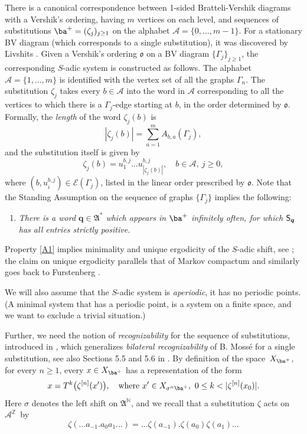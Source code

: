 \documentclass[JEP,XML,SOM,Unicode]{cedram}
\let\mathcal\mathscr
\theoremstyle{plain}
\theoremstyle{definition}
\newcommand\bq{{\boldsymbol q}}
\let\Gam\Gamma
\let\sig\sigma
\newcommand\ok{\mathfrak{o}}
\newcommand\FrA{\mathfrak{A}}
\newcommand\Ak{\mathcal{A}}
\newcommand\A{\mathcal{A}}
\newcommand{\Ek}{\mathcal{E}}
\newcommand{\Z}{\mathbb{Z}}
\newcommand{\N}{\mathbb{N}}
\newcommand\Sf{{\sf S}}
\newcommand\be{\begin{equation}}
\newcommand\ee{\end{equation}}
\begin{document}
There is a canonical correspondence between 1-sided Bratteli-Vershik diagrams with a Vershik's ordering, having $m$ vertices on each level, and sequences of substitutions $\ba^+=(\zeta_j)_{j\ge 1}$ on the alphabet
$\Ak = \{0,\ldots,m-1\}$. For a stationary BV diagram (which corresponds to a single substitution), it was discovered by Livshits \cite{Liv1}.
Given a Vershik's ordering $\ok$ on a BV diagram
$\{\Gam_{j}\}_{j\ge 1}$, the corresponding $S$-adic system is constructed as follows. The
alphabet $\Ak = \{1,\ldots,m\}$ is identified with the vertex set of all the graphs $\Gam_n$.
The substitution $\zeta_j$ takes every $b\in \A$ into the word in $\A$ corresponding to all the vertices to which
there is a $\Gam_{j}$-edge starting at $b$, in the order determined by $\ok$. Formally, the \emph{length} of the word $\zeta_j(b)$ is
\[
|\zeta_j(b)| = \sum_{a=1}^m A_{b,a}(\Gam_j),
\]
and the substitution itself is given by
\be \label{def-subs1}
\zeta_j(b) =u_1^{b,j}\dots u_{|\zeta_j(b)|}^{b,j},\quad b\in \A,\ j\ge 0,
\ee
where $(b, u_i^{b,j})\in \Ek(\Gam_j)$, listed in the linear order prescribed by $\ok$. Note that the Standing Assumption on the sequence of graphs $\{\Gam_j\}$ implies the following:
\begin{enumerate}\renewcommand{\theenumi}{A\arabic{enumi}}
\item\label{A1}
\emph{There is a word $\bq\in \FrA^*$ which appears in $\ba^+$ infinitely often, for which $\Sf_\bq$ has all entries strictly positive.}
\end{enumerate}

Property \eqref{A1} implies minimality and unique ergodicity of the $S$-adic shift, see \hbox{\cite[Th.\,5.2 \& 5.7]{BD}}; the claim on unique ergodicity parallels that of Markov compactum and similarly goes back to Furstenberg \cite[(16.13)]{furst}.

We will also assume that the $S$-adic system is \emph{aperiodic}, \ie it has no periodic points. (A minimal system that has a periodic point, is a system on a finite space, and we want to exclude a trivial situation.)

Further, we need the notion of \emph{recognizability} for the sequence of substitutions, introduced
in \cite{BSTY}, which generalizes \emph{bilateral recognizability} of B. Mossé \cite{Mosse} for a single substitution, see also Sections 5.5 and 5.6 in \cite{Queff}. By definition of the space~$X_{\ba^+}$, for every $n\ge 1$, every $x\in X_{\ba^+}$ has a representation of the form
\be \label{recog}
x = T^k\bigl(\zeta^{[n]}(x')\bigr),\quad \text{where } x'\in X_{\sig^n \ba^+},\ 0\le k < |\zeta^{[n]}(x_0)|.
\ee
Here $\sig$ denotes the left shift on $\FrA^\N$, and we recall that a substitution $\zeta$ acts on~$\Ak^\Z$~by
\[
\zeta(\ldots a_{-1}.a_0 a_1\ldots) = \ldots \zeta(a_{-1}).\zeta(a_0)\zeta(a_1)\ldots
\]
\end{document}
